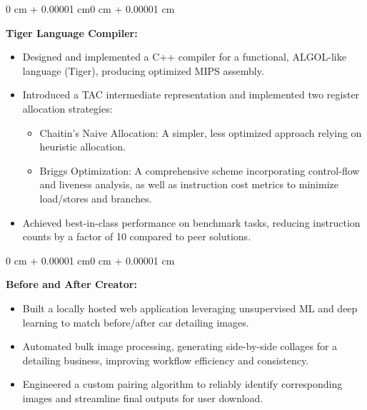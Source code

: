 \documentclass[11pt, letterpaper]{article}
\newenvironment{highlights}{
    \begin{itemize}[
        topsep=0.10 cm,
        parsep=0.10 cm,
        partopsep=0pt,
        itemsep=0pt,
        leftmargin=0.4 cm + 10pt
    ]
}{
    \end{itemize}
}
\newenvironment{onecolentry}{
    \begin{adjustwidth}{0 cm + 0.00001 cm}{0 cm + 0.00001 cm}
}{
    \end{adjustwidth}
}
\begin{document}
\begin{onecolentry}
    \textbf{Tiger Language Compiler:}
    \begin{highlights}
        \item Designed and implemented a C++ compiler for a functional, ALGOL-like language (Tiger), producing optimized MIPS assembly.
        \item Introduced a TAC intermediate representation and implemented two register allocation strategies:
            \begin{itemize}
                \item Chaitin's Naive Allocation: A simpler, less optimized approach relying on heuristic allocation.
                \item Briggs Optimization: A comprehensive scheme incorporating control-flow and liveness analysis, as well as instruction cost metrics to minimize load/stores and branches.
            \end{itemize}
        \item Achieved best-in-class performance on benchmark tasks, reducing instruction counts by a factor of 10 compared to peer solutions.
    \end{highlights}
\end{onecolentry}

\vspace{0.4 cm}

\begin{onecolentry}
    \textbf{Before and After Creator:}
    \begin{highlights}
        \item Built a locally hosted web application leveraging unsupervised ML and deep learning to match before/after car detailing images.
        \item Automated bulk image processing, generating side-by-side collages for a detailing business, improving workflow efficiency and consistency.
        \item Engineered a custom pairing algorithm to reliably identify corresponding images and streamline final outputs for user download.
    \end{highlights}
\end{onecolentry}
\end{document}
